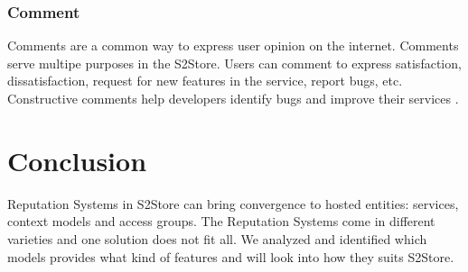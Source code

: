 \subsubsection{Comment}

Comments are a common way to express user opinion on the internet. Comments serve multipe purposes in the S2Store. Users can comment to express satisfaction, dissatisfaction, request for new features in the service, report bugs, etc. Constructive comments help developers identify bugs and improve their services \cite{pagano2013user}.

\section*{Conclusion}

Reputation Systems in S2Store can bring convergence to hosted entities: services, context models and access groups. The Reputation Systems come in different varieties and one solution does not fit all. We analyzed and identified which models provides what kind of features and will look into how they suits S2Store.